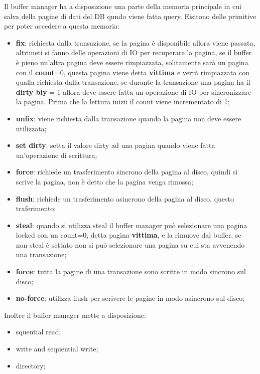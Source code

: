 \documentclass[12pt]{article}
\begin{document}
Il buffer manager ha a disposizione una parte della memoria principale in cui salva della pagine di dati del DB qundo viene fatta query. Eisitono delle primitive per poter accedere a questa memoria:
\begin{itemize}
    \item \textbf{fix}: richiesta dalla transazione, se la pagina \`e disponibile allora viene passata, altrimeti si fanno delle operazioni di IO per recuperare la pagina, se il buffer \`e pieno un'altra pagina deve essere rimpiazzata, solitamente sar\`a un pagina con il \textbf{count}=0, questa pagina viene detta \textbf{vittima} e verr\`a rimpiazzata con qualla richiesta dalla transazione, se durante la transazione una pagina ha il \textbf{dirty biy} = 1 allora deve essere fatta un operazione di IO per sincronizzare la pagina. Prima che la lettura inizii il count viene incrementato di 1;
    \item \textbf{unfix}: viene richiesta dalla transazione quando la pagina non deve essere utilizzata;
    \item \textbf{set dirty}: setta il valore dirty ad una pagina quando viene fatta un'operazione di scrittura;
    \item \textbf{force}: richiede un trasferimento sincrono della pagina al disco, quindi si scrive la pagina, non \`e detto che la pagina venga rimossa;
    \item \textbf{flush}: richiede un trasferimento asincrono della pagina al disco, questo traferimento;
    \item \textbf{steal}: quando si utilizza steal il buffer manager pu\`o selezionare una pagina locked con un count=0, detta pagina \textbf{vittima}, e la rimuove dal buffer, se non-steal \`e settato non si pu\`o selezionare una pagina su cui sta avvenendo una transazione;
    \item \textbf{force}: tutta la pagine di una transazione sono scritte in modo sincrono sul disco;
    \item \textbf{no-force}: utilizza flush per scrivere le pagine in modo asincrono sul disco;
\end{itemize}
Inoltre il buffer manager mette a disposizione:
\begin{itemize}
    \item squential read;
    \item write and sequential write;
    \item directory;
\end{itemize}
\end{document}
